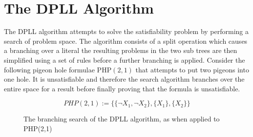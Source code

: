 \section{The DPLL Algorithm}
The DPLL algorithm attempts to solve the satisfiability problem by performing a search of problem space. The algorithm consists of a split operation which causes a branching over a literal the resulting problems in the two sub trees are then simplified using a set of rules before a further branching is applied. Consider the following pigeon hole formulae $\mathrm{PHP}(2,1)$ that attempts to put two pigeons into one hole. It is unsatisfiable and therefore the search algorithm branches over the entire space for a result before finally proving that the formula is unsatisfiable.

$$PHP(2,1) := \{\{\neg X_1, \neg X_2\}, \{ X_1 \}, \{ X_2 \} \}$$


\bigskip
\begin{figure}[h!]
\begin{center}
\end{center}
\caption{The branching search of the DPLL algorithm, as when applied to PHP(2,1)}
\end{figure}
\bigskip

